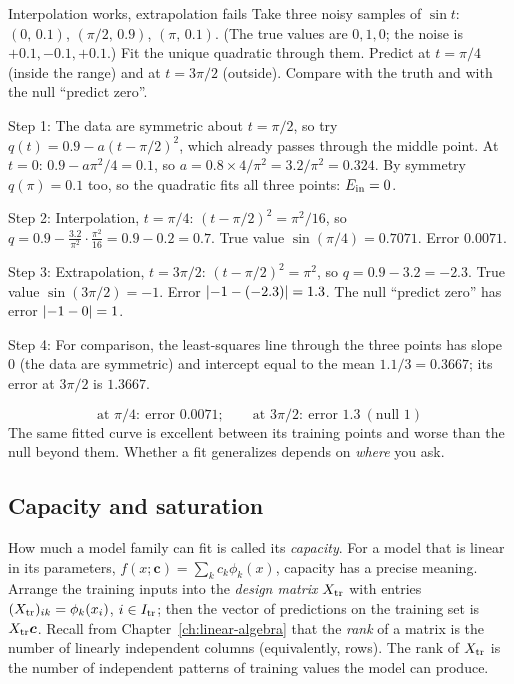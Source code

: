 \begin{sample}{Interpolation works, extrapolation fails}
Take three noisy samples of $\sin t$: $(0,\,0.1)$, $(\pi/2,\,0.9)$, $(\pi,\,0.1)$. (The true values are $0,1,0$; the noise is $+0.1,-0.1,+0.1$.) Fit the unique quadratic through them. Predict at $t=\pi/4$ (inside the range) and at $t=3\pi/2$ (outside). Compare with the truth and with the null ``predict zero''.

Step 1: The data are symmetric about $t=\pi/2$, so try $q(t)=0.9-a(t-\pi/2)^2$, which already passes through the middle point. At $t=0$: $0.9-a\pi^2/4=0.1$, so $a=0.8\times4/\pi^2=3.2/\pi^2=0.324$. By symmetry $q(\pi)=0.1$ too, so the quadratic fits all three points: $E_{\rm in}=0$.

Step 2: Interpolation, $t=\pi/4$: $(t-\pi/2)^2=\pi^2/16$, so $q=0.9-\frac{3.2}{\pi^2}\cdot\frac{\pi^2}{16}=0.9-0.2=0.7$. True value $\sin(\pi/4)=0.7071$. Error $0.0071$.

Step 3: Extrapolation, $t=3\pi/2$: $(t-\pi/2)^2=\pi^2$, so $q=0.9-3.2=-2.3$. True value $\sin(3\pi/2)=-1$. Error $\left\lvert -1-(-2.3)\right\rvert=1.3$. The null ``predict zero'' has error $\left\lvert -1-0\right\rvert=1$.

Step 4: For comparison, the least-squares line through the three points has slope 0 (the data are symmetric) and intercept equal to the mean $1.1/3=0.3667$; its error at $3\pi/2$ is $1.3667$.

\[
\boxed{\text{at }\pi/4:\ \text{error }0.0071;\qquad\text{at }3\pi/2:\ \text{error }1.3\ (\text{null }1)}
\]
The same fitted curve is excellent between its training points and worse than the null beyond them. Whether a fit generalizes depends on \emph{where} you ask.
\end{sample}

\subsection{Capacity and saturation}

How much a model family can fit is called its \emph{capacity}. For a model that is linear in its parameters, $f(x;\bm c)=\sum_{k}c_k\phi_k(x)$, capacity has a precise meaning. Arrange the training inputs into the \emph{design matrix} $X_{\rm tr}$ with entries $(X_{\rm tr})_{ik}=\phi_k(x_i)$, $i\in I_{\rm tr}$; then the vector of predictions on the training set is $X_{\rm tr}\bm c$. Recall from Chapter~\ref{ch:linear-algebra} that the \emph{rank} of a matrix is the number of linearly independent columns (equivalently, rows). The rank of $X_{\rm tr}$ is the number of independent patterns of training values the model can produce.


